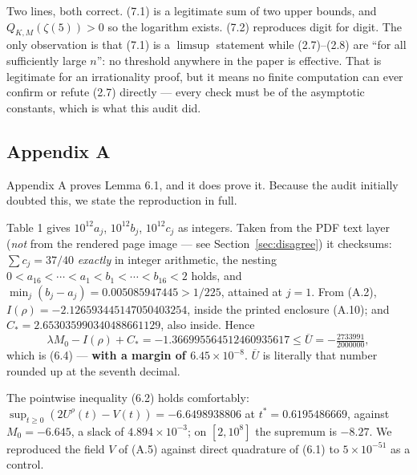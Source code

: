 \documentclass[11pt]{article}
\theoremstyle{definition}
\newcommand{\z}{\zeta(5)}
\newcommand{\Ub}{\overline{U}}
\begin{document}
Two lines, both correct. (7.1) is a legitimate sum of two upper bounds, and $Q_{K,M}(\z)>0$ so
the logarithm exists. (7.2) reproduces digit for digit. The only observation is that (7.1) is a
$\limsup$ statement while (2.7)--(2.8) are ``for all sufficiently large $n$'': no threshold
anywhere in the paper is effective. That is legitimate for an irrationality proof, but it means
no finite computation can ever confirm or refute (2.7) directly --- every check must be of the
asymptotic constants, which is what this audit did.

\subsection{Appendix A}\label{sec:appA}

Appendix A proves Lemma 6.1, and it does prove it. Because the audit initially doubted this, we
state the reproduction in full.

Table 1 gives $10^{12}a_j$, $10^{12}b_j$, $10^{12}c_j$ as integers. Taken from the PDF text
layer (\emph{not} from the rendered page image --- see Section~\ref{sec:disagree}) it
checksums: $\sum c_j=37/40$ \emph{exactly} in integer arithmetic, the nesting
$0<a_{16}<\cdots<a_1<b_1<\cdots<b_{16}<2$ holds, and $\min_j(b_j-a_j)=0.005085947445>1/225$,
attained at $j=1$. From (A.2), $I(\rho)=-2.126593445147050403254$, inside the printed enclosure
(A.10); and $C_*=2.653035990340488661129$, also inside. Hence
\[
\lambda M_0-I(\rho)+C_*=-1.366995564512460935617\le\Ub=-\tfrac{2733991}{2000000},
\]
which is (6.4) --- \textbf{with a margin of $6.45\times10^{-8}$}. $\Ub$ is literally that number
rounded up at the seventh decimal.

The pointwise inequality (6.2) holds comfortably:
$\sup_{t\ge0}(2U^\rho(t)-V(t))=-6.6498938806$ at $t^*=0.6195486669$, against $M_0=-6.645$, a
slack of $4.894\times10^{-3}$; on $[2,10^8]$ the supremum is $-8.27$. We reproduced the
field $V$ of (A.5) against direct quadrature of (6.1) to $5\times10^{-51}$ as a control.
\end{document}
